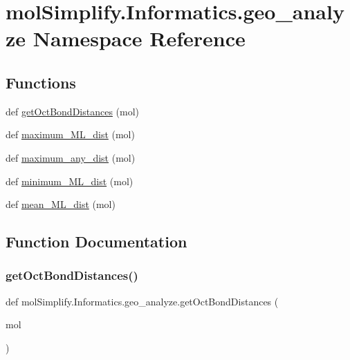 \hypertarget{namespacemolSimplify_1_1Informatics_1_1geo__analyze}{}\section{mol\+Simplify.\+Informatics.\+geo\+\_\+analyze Namespace Reference}
\label{namespacemolSimplify_1_1Informatics_1_1geo__analyze}
\subsection*{Functions}
\begin{DoxyCompactItemize}
\item 
def \hyperlink{namespacemolSimplify_1_1Informatics_1_1geo__analyze_a6cdf6180a0a2fc06d453125fd482bfce}{get\+Oct\+Bond\+Distances} (mol)
\item 
def \hyperlink{namespacemolSimplify_1_1Informatics_1_1geo__analyze_a4772b7a600f0099e75bc3500e3766d13}{maximum\+\_\+\+M\+L\+\_\+dist} (mol)
\item 
def \hyperlink{namespacemolSimplify_1_1Informatics_1_1geo__analyze_a8a88058dfdcd44afae0f97faa15454d8}{maximum\+\_\+any\+\_\+dist} (mol)
\item 
def \hyperlink{namespacemolSimplify_1_1Informatics_1_1geo__analyze_aa22ca76b20cb16e0b9d3fe3d9de533e8}{minimum\+\_\+\+M\+L\+\_\+dist} (mol)
\item 
def \hyperlink{namespacemolSimplify_1_1Informatics_1_1geo__analyze_a612b3caec60ab7b0a52977261b7bd79e}{mean\+\_\+\+M\+L\+\_\+dist} (mol)
\end{DoxyCompactItemize}


\subsection{Function Documentation}
\mbox{\label{namespacemolSimplify_1_1Informatics_1_1geo__analyze_a6cdf6180a0a2fc06d453125fd482bfce}} 
\subsubsection{\texorpdfstring{get\+Oct\+Bond\+Distances()}{getOctBondDistances()}}
{\footnotesize\ttfamily def mol\+Simplify.\+Informatics.\+geo\+\_\+analyze.\+get\+Oct\+Bond\+Distances (\begin{DoxyParamCaption}\item[{}]{mol }\end{DoxyParamCaption})}

